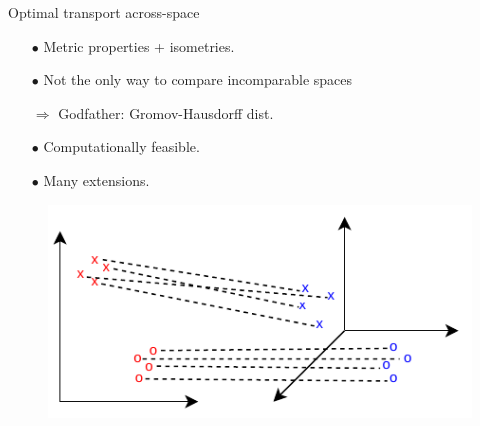 \documentclass{beamer}
\begin{document}
\begin{frame}{Optimal transport across-space}
\vspace{-0.3cm}
\begin{minipage}[t]{0.5\linewidth}
\begin{itemize}
  \item[$\bullet$] Metric properties + isometries.
  \item[$\bullet$] Not the only way to compare incomparable spaces

  $\Rightarrow$ Godfather: Gromov-Hausdorff dist.
  \item[$\bullet$] Computationally feasible.
  \item[$\bullet$] Many extensions.
\end{itemize}
\end{minipage}%
\hfill%
\hspace{-6cm}
\begin{minipage}[t]{0.5\linewidth}
  \vspace{0.5cm}
\begin{figure}
  \centering
  \includegraphics[width=1.15\linewidth, keepaspectratio=true]{OT_new/gw.pdf}
\end{figure}
\end{minipage}

\end{frame}
\end{document}
